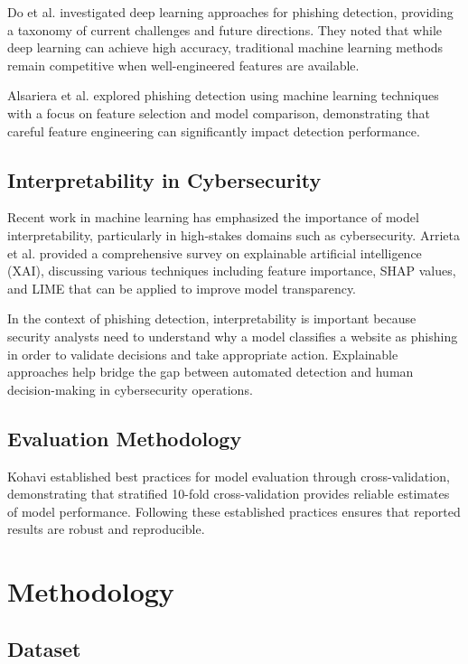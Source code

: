 \documentclass[conference]{IEEEtran}
\begin{document}
Do et al. \cite{do2022} investigated deep learning approaches for phishing detection, providing a taxonomy of current challenges and future directions. They noted that while deep learning can achieve high accuracy, traditional machine learning methods remain competitive when well-engineered features are available.

Alsariera et al. \cite{alsariera2022} explored phishing detection using machine learning techniques with a focus on feature selection and model comparison, demonstrating that careful feature engineering can significantly impact detection performance.

\subsection{Interpretability in Cybersecurity}

Recent work in machine learning has emphasized the importance of model interpretability, particularly in high-stakes domains such as cybersecurity. Arrieta et al. \cite{arrieta2020} provided a comprehensive survey on explainable artificial intelligence (XAI), discussing various techniques including feature importance, SHAP values, and LIME that can be applied to improve model transparency.

In the context of phishing detection, interpretability is important because security analysts need to understand why a model classifies a website as phishing in order to validate decisions and take appropriate action. Explainable approaches help bridge the gap between automated detection and human decision-making in cybersecurity operations.

\subsection{Evaluation Methodology}

Kohavi \cite{kohavi1995} established best practices for model evaluation through cross-validation, demonstrating that stratified 10-fold cross-validation provides reliable estimates of model performance. Following these established practices ensures that reported results are robust and reproducible.

\section{Methodology}

\subsection{Dataset}
\end{document}

